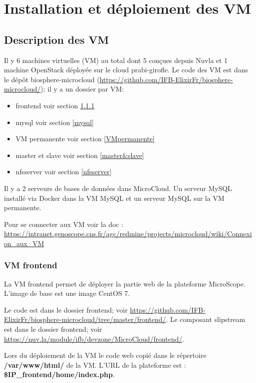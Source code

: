 \chapter {Installation et déploiement des VM}

\section {Description des VM}

Il y 6 machines virtuelles (VM) au total dont 5 conçues depuis Nuvla et 1 machine OpenStack déployée sur le cloud prabi-girofle.
Le code des VM est dans le dépôt biosphere-microcloud (\url{https://github.com/IFB-ElixirFr/biosphere-microcloud/}); il y a un dossier par VM:

\begin{itemize}
	\item frontend voir section \ref{frontend}
	\item mysql voir section \ref{mysql}
	\item VM permanente voir section \ref{VMpermanente}
	\item master et slave voir section \ref{master&slave}
	\item nfsserver voir section \ref{nfsserver}
\end{itemize}
\bigskip

Il y a 2 serveurs de bases de données dans MicroCloud. Un serveur MySQL installé via Docker dans la VM MySQL et un serveur MySQL sur la VM permanente.
\bigskip

Pour se connecter aux VM voir la doc : \url{https://intranet.genoscope.cns.fr/agc/redmine/projects/microcloud/wiki/Connexion_aux_VM}

\subsection {VM frontend}\label{frontend}

La VM frontend permet de déployer la partie web de la plateforme MicroScope. L'image de base est une image CentOS 7.

Le code est dans le dossier frontend; voir \url{https://github.com/IFB-ElixirFr/biosphere-microcloud/tree/master/frontend/}.
Le composant slipstream est dans le dossier frontend; voir \url{https://nuv.la/module/ifb/devzone/MicroCloud/frontend/}.
\bigskip

Lors du déploiement de la VM le code web copié dans le répertoire \textbf{/var/www/html/} de la VM.
L'URL de la plateforme est : \textbf{\$IP\_frontend/home/index.php}.

